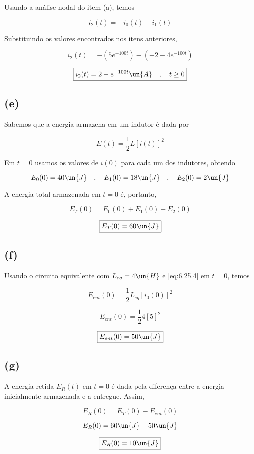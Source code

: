 Usando a análise nodal do item (a), temos

\[ i_2(t) = - i_0(t) - i_1(t)  \]

Substituindo os valores encontrados nos itens anteriores,

\[ i_2(t) = - (5e^{-100t}) - (-2 -4 e^{-100t}) \]

\[ \boxed{i_2(t) = 2 - e^{-100t} \un{A} \quad ,  \quad t \geq 0}  \]

\subsection*{(e)}

Sabemos que a energia armazena em um indutor é dada por 

\begin{equation}\label{eq:6.25.4}
    E(t) = \frac{1}{2}L\left[i(t)\right]^2
\end{equation}

Em $t=0$ usamos os valores de $i(0)$ para cada um dos indutores, obtendo

\[ E_0(0) = 40 \un{J} \quad , \quad E_1(0) = 18 \un{J} \quad , \quad E_2(0) = 2 \un{J}   \]

A energia total armazenada em $t=0$ é, portanto, 

\[ E_T(0) = E_0(0) + E_1(0) + E_2(0)  \]

\[ \boxed{E_T(0) = 60 \un{J}}  \]

\subsection*{(f)}

Usando o circuito equivalente com $L_{eq} = 4\un{H}$ e \eqref{eq:6.25.4} em $t=0$, temos

\[ E_{ent}(0) = \frac{1}{2}L_{eq}[i_0(0)]^2  \]

\[ E_{ent}(0) = \frac{1}{2}4[5]^2  \]

\[ \boxed{E_{ent}(0) = 50 \un{J}}  \]

\subsection*{(g)}

A energia retida $E_R(t)$ em $t=0$ é dada pela diferença entre a energia inicialmente armazenada e a entregue. Assim,    

\[ E_{R}(0) = E_T(0) - E_{ent}(0)  \]

\[ E_{R}(0) = 60\un{J} - 50\un{J}  \]

\[ \boxed{E_{R}(0) = 10\un{J}}  \]

